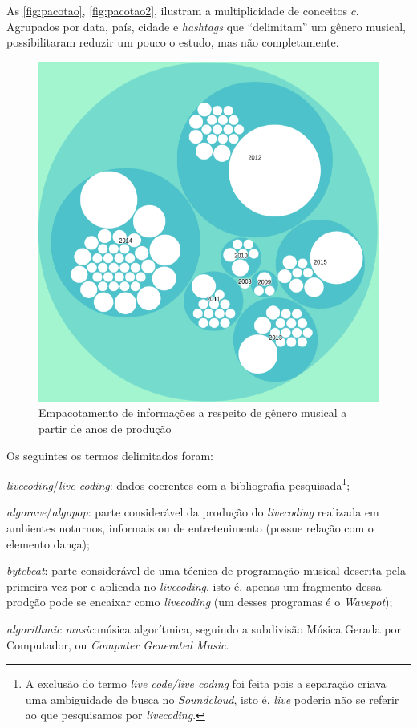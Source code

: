 As \autoref{fig:pacotao}, \autoref{fig:pacotao2}, ilustram a multiplicidade de conceitos $c$. Agrupados por data, país, cidade e \emph{hashtags} que ``delimitam'' um gênero musical, possibilitaram reduzir um pouco o estudo, mas não completamente.

\begin{figure}[h]
\begin{center}
\includegraphics[scale=0.6]{./imagens/zoomable_circle_packing_genre_year_livecoding.png}
\caption{Empacotamento de informações a respeito de gênero musical a partir de anos de produção}
\label{fig:pacotao}
\end{center}
\end{figure}

Os seguintes os termos delimitados foram: \begin{inparaenum}
\item \emph{livecoding}/\emph{live-coding}: dados coerentes com a bibliografia pesquisada\footnote{A exclusão do termo \emph{live code/live coding} foi feita pois a separação criava uma ambiguidade de busca no \emph{Soundcloud}, isto é, \emph{live} poderia não se referir ao que pesquisamos por \emph{livecoding}.};
\item \emph{algorave}/\emph{algopop}: parte considerável da produção do \emph{livecoding} realizada em ambientes noturnos, informais ou de entretenimento (possue relação com o elemento dança);
\item \emph{bytebeat}: parte considerável de uma técnica de programação musical descrita pela primeira vez por  e aplicada no \emph{livecoding}, isto é, apenas um fragmento dessa prodção pode se encaixar como \emph{livecoding} (um desses programas é o \emph{Wavepot});
\item \emph{algorithmic music}:música algorítmica, seguindo a subdivisão Música Gerada por Computador, ou \emph{Computer Generated Music}\cite{cope_prefacio_2008}.
\end{inparaenum}

